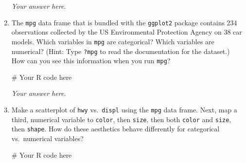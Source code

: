 \documentclass[
  letterpaper,
  DIV=11,
  numbers=noendperiod]{scrreprt}
\newenvironment{Shaded}{\begin{snugshade}}{\end{snugshade}}
\newcommand{\CommentTok}[1]{\textcolor[rgb]{0.37,0.37,0.37}{#1}}
\begin{document}
\begin{enumerate}
\begin{tcolorbox}
  \emph{Your answer here.}

  \end{tcolorbox}
\item
  The \texttt{mpg} data frame that is bundled with the \texttt{ggplot2}
  package contains 234 observations collected by the US Environmental
  Protection Agency on 38 car models. Which variables in \texttt{mpg}
  are categorical? Which variables are numerical? (Hint: Type
  \texttt{?mpg} to read the documentation for the dataset.) How can you
  see this information when you run \texttt{mpg}?

  \begin{tcolorbox}[enhanced jigsaw, left=2mm, rightrule=.15mm, bottomtitle=1mm, opacitybacktitle=0.6, leftrule=.75mm, opacityback=0, colframe=quarto-callout-note-color-frame, bottomrule=.15mm, coltitle=black, toptitle=1mm, colback=white, titlerule=0mm, colbacktitle=quarto-callout-note-color!10!white, title={Answer}, toprule=.15mm, breakable, arc=.35mm]

\begin{Shaded}
\begin{Highlighting}[]
\CommentTok{\# Your R code here}
\end{Highlighting}
\end{Shaded}

  \emph{Your answer here.}

  \end{tcolorbox}
\item
  Make a scatterplot of \texttt{hwy} vs.~\texttt{displ} using the
  \texttt{mpg} data frame. Next, map a third, numerical variable to
  \texttt{color}, then \texttt{size}, then both \texttt{color} and
  \texttt{size}, then \texttt{shape}. How do these aesthetics behave
  differently for categorical vs.~numerical variables?

  \begin{tcolorbox}[enhanced jigsaw, left=2mm, rightrule=.15mm, bottomtitle=1mm, opacitybacktitle=0.6, leftrule=.75mm, opacityback=0, colframe=quarto-callout-note-color-frame, bottomrule=.15mm, coltitle=black, toptitle=1mm, colback=white, titlerule=0mm, colbacktitle=quarto-callout-note-color!10!white, title={Answer}, toprule=.15mm, breakable, arc=.35mm]

\begin{Shaded}
\begin{Highlighting}[]
\CommentTok{\# Your R code here}
\end{Highlighting}
\end{Shaded}


\end{tcolorbox}
\end{enumerate}
\end{document}
